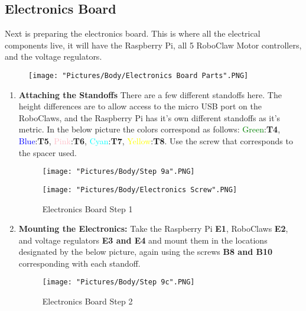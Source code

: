 \documentclass[12pt]{article}
\begin{document}
\subsection{Electronics Board}

Next is preparing the electronics board. This is where all the electrical components live, it will have the Raspberry Pi, all 5 RoboClaw Motor controllers, and the voltage regulators. 

\begin{figure}[H]
	\centering
	\texttt{[image: "Pictures/Body/Electronics Board Parts".PNG]}
\end{figure}



\begin{enumerate}
\item \textbf{Attaching the Standoffs} There are a few different standoffs here. The height differences are to allow access to the micro USB port on the RoboClaws, and the Raspberry Pi has it's own different standoffs as it's metric. In the below picture the colors correspond as follows: \textcolor{green}{Green}:\textbf{T4}, \textcolor{blue}{Blue}:\textbf{T5}, \textcolor{pink}{Pink}:\textbf{T6}, \textcolor{cyan}{Cyan}:\textbf{T7}, \textcolor{yellow}{Yellow}:\textbf{T8}. Use the screw that corresponds to the spacer used.

\begin{figure}[H]
  \centering
  \begin{minipage}[b]{0.50\textwidth}
    \texttt{[image: "Pictures/Body/Step 9a".PNG]}
  \end{minipage}
  \hfill
  \begin{minipage}[b]{0.35\textwidth}
    \texttt{[image: "Pictures/Body/Electronics Screw".PNG]}
  \end{minipage}

  \caption{Electronics Board Step 1}
\end{figure}

\item \textbf{Mounting the Electronics:} Take the Raspberry Pi \textbf{E1}, RoboClaws \textbf{E2}, and voltage regulators \textbf{E3 and E4} and mount them in the locations designated by the below picture, again using the screws \textbf{B8 and B10} corresponding with each standoff. 

\begin{figure}[H]
\centering	
  \texttt{[image: "Pictures/Body/Step 9c".PNG]}
  \caption{Electronics Board Step 2}
\end{figure}


\end{enumerate}
\end{document}
